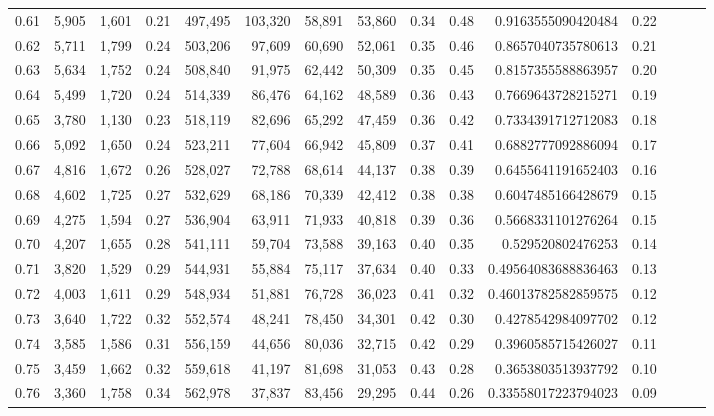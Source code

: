 \begin{tabular}{rrrrrrrrrrrrrrr}
0.61 &   5,905 &  1,601 &  0.21 &  497,495 &  103,320 &   58,891 &   53,860 &  0.34 &  0.48 &    0.9163555090420484 &      0.22 \\
0.62 &   5,711 &  1,799 &  0.24 &  503,206 &   97,609 &   60,690 &   52,061 &  0.35 &  0.46 &    0.8657040735780613 &      0.21 \\
0.63 &   5,634 &  1,752 &  0.24 &  508,840 &   91,975 &   62,442 &   50,309 &  0.35 &  0.45 &    0.8157355588863957 &      0.20 \\
0.64 &   5,499 &  1,720 &  0.24 &  514,339 &   86,476 &   64,162 &   48,589 &  0.36 &  0.43 &    0.7669643728215271 &      0.19 \\
0.65 &   3,780 &  1,130 &  0.23 &  518,119 &   82,696 &   65,292 &   47,459 &  0.36 &  0.42 &    0.7334391712712083 &      0.18 \\
0.66 &   5,092 &  1,650 &  0.24 &  523,211 &   77,604 &   66,942 &   45,809 &  0.37 &  0.41 &    0.6882777092886094 &      0.17 \\
0.67 &   4,816 &  1,672 &  0.26 &  528,027 &   72,788 &   68,614 &   44,137 &  0.38 &  0.39 &    0.6455641191652403 &      0.16 \\
0.68 &   4,602 &  1,725 &  0.27 &  532,629 &   68,186 &   70,339 &   42,412 &  0.38 &  0.38 &    0.6047485166428679 &      0.15 \\
0.69 &   4,275 &  1,594 &  0.27 &  536,904 &   63,911 &   71,933 &   40,818 &  0.39 &  0.36 &    0.5668331101276264 &      0.15 \\
0.70 &   4,207 &  1,655 &  0.28 &  541,111 &   59,704 &   73,588 &   39,163 &  0.40 &  0.35 &     0.529520802476253 &      0.14 \\
0.71 &   3,820 &  1,529 &  0.29 &  544,931 &   55,884 &   75,117 &   37,634 &  0.40 &  0.33 &   0.49564083688836463 &      0.13 \\
0.72 &   4,003 &  1,611 &  0.29 &  548,934 &   51,881 &   76,728 &   36,023 &  0.41 &  0.32 &   0.46013782582859575 &      0.12 \\
0.73 &   3,640 &  1,722 &  0.32 &  552,574 &   48,241 &   78,450 &   34,301 &  0.42 &  0.30 &    0.4278542984097702 &      0.12 \\
0.74 &   3,585 &  1,586 &  0.31 &  556,159 &   44,656 &   80,036 &   32,715 &  0.42 &  0.29 &    0.3960585715426027 &      0.11 \\
0.75 &   3,459 &  1,662 &  0.32 &  559,618 &   41,197 &   81,698 &   31,053 &  0.43 &  0.28 &    0.3653803513937792 &      0.10 \\
0.76 &   3,360 &  1,758 &  0.34 &  562,978 &   37,837 &   83,456 &   29,295 &  0.44 &  0.26 &   0.33558017223794023 &      0.09 \\

\end{tabular}
